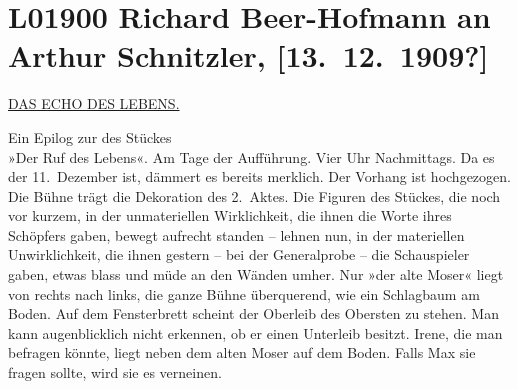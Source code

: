 

\section[Richard Beer-Hofmann an Arthur Schnitzler, {[}13. 12. 1909?{]}]{L01900 Richard Beer-Hofmann an Arthur Schnitzler, {[}13. 12. 1909?{]}}
\nopagebreak{}
\rehead{ }\normalsize\beginnumbering{}
\toendnotes[C]{\smallbreak\pagebreak[2]}
\toendnotes[C]{\smallbreak}
\pstart
           \noindent{}\centering{}{\pb}\uline{DAS ECHO DES LEBENS.}\pend
           
\pstart
           \centering{}Ein Epilog zur \label{K_L01900-1v}\label{K_L01900-1} des
                  Stückes{\\}»Der Ruf des Lebens«.\pend
           {\vspace{1\baselineskip}}
\pstart
           Am Tage der Aufführung. Vier Uhr Nachmittags. Da es der 11. Dezember
               ist, dämmert es bereits merklich. Der Vorhang ist hochgezogen. Die Bühne trägt die
               Dekoration des 2. Aktes. Die
               Figuren des Stückes, die noch vor kurzem, in der unmateriellen Wirklichkeit, die
               ihnen die Worte ihres Schöpfers gaben, bewegt aufrecht standen – lehnen nun, in der
               materiellen Unwirklichkeit, die ihnen gestern – bei der Generalprobe – die
               Schauspieler gaben, etwas blass und müde an den Wänden umher. Nur »der alte Moser«
               liegt von rechts nach links, die ganze Bühne überquerend, wie ein Schlagbaum am
               Boden. Auf dem Fensterbrett scheint der Oberleib des Obersten zu stehen. Man kann
               augenblicklich nicht erkennen, ob er einen Unterleib besitzt. Irene, die man befragen
               könnte, liegt neben dem alten Moser auf dem Boden. Falls Max sie fragen sollte, wird
               sie es verneinen.\pend
           
